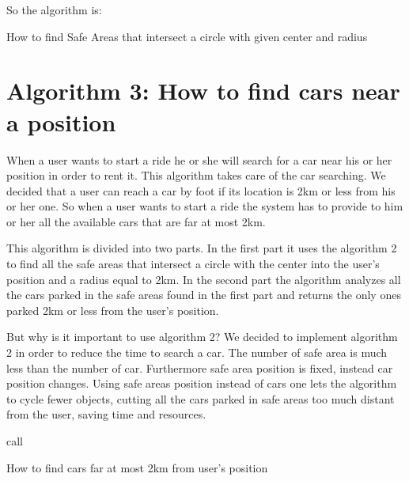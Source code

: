So the algorithm is:
\BlankLine
\begin{algorithm}[H]


	\BlankLine
{}
\Return \Res \;
\caption{How to find Safe Areas that intersect a circle with given center and radius}
\end{algorithm}

\section{Algorithm 3: How to find cars near a position}
When a user wants to start a ride he or she will search for a car near his or her position in order to rent it. This algorithm takes care of the car searching.
We decided that a user can reach a car by foot if its location is 2km or less from his or her one. So when a user wants to start a ride the system has to provide to him or her all the available cars that are far at most 2km.

This algorithm is divided into two parts. In the first part it uses the algorithm 2 to find all the safe areas that intersect a circle with the center into the user's position and a radius equal to 2km. In the second part the algorithm analyzes all the cars parked in the safe areas found in the first part and returns the only ones parked 2km or less from the user's position.

But why is it important to use algorithm 2? We decided to implement algorithm 2 in order to reduce the time to search a car. The number of safe area is much less than the number of car. Furthermore safe area position is fixed, instead car position changes. Using safe areas position instead of cars one lets the algorithm to cycle fewer objects, cutting all the cars parked in safe areas too much distant from the user, saving time and resources.

\BlankLine
\begin{algorithm}[H]


	\BlankLine
	
call \;
\Return \Res \;
\caption{How to find cars far at most 2km from user's position}
\end{algorithm}


